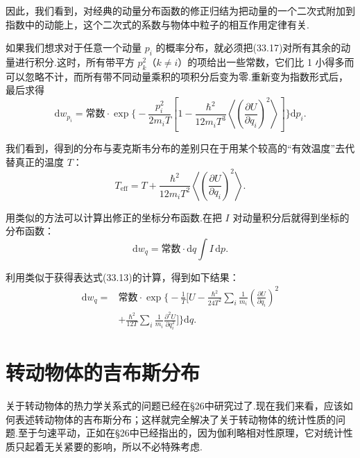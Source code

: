 因此，我们看到，对经典的动量分布函数的修正归结为把动量的一个二次式附加到指数中的动能上，这个二次式的系数与物体中粒子的相互作用定律有关.

如果我们想求对于任意一个动量 $p_i$ 的概率分布，就必须把(33.17)对所有其余的动量进行积分.这时，所有带平方 $p_k^2$（$k\neq i$）的项给出一些常数，它们比 1 小得多而可以忽略不计，而所有带不同动量乘积的项积分后变为零.重新变为指数形式后，最后求得
\begin{equation}
  \mathrm{d}w_{p_i}=\text{常数}\cdot\exp\bigg\{-\frac{p_i^2}{2m_iT}
  \left[1-\frac{\hbar^2}{12m_iT^3}
  \left\langle\left(\frac{\partial U}{\partial q_i}\right)^2\right\rangle\right]\bigg\}\mathrm{d}p_i.
\end{equation}

我们看到，得到的分布与麦克斯韦分布的差别只在于用某个较高的“有效温度”去代替真正的温度 $T$：
\begin{equation*}
  T_{\mathrm{eff}}=T+\frac{\hbar^2}{12m_iT^2}
  \left\langle\left(\frac{\partial U}{\partial q_i}\right)^2\right\rangle.
\end{equation*}

用类似的方法可以计算出修正的坐标分布函数.在把 $I$ 对动量积分后就得到坐标的分布函数：
\begin{equation*}
  \mathrm{d}w_q=\text{常数}\cdot\mathrm{d}q\int I\,\mathrm{d}p.
\end{equation*}

利用类似于获得表达式(33.13)的计算，得到如下结果：
\begin{equation}
\begin{aligned}
  \mathrm{d}w_q={}&\text{常数}\cdot\exp\bigg\{-\frac{1}{T}\bigg[U
  -\frac{\hbar^2}{24T^2}\sum_i\frac{1}{m_i}\left(\frac{\partial U}{\partial q_i}\right)^2\\
  &+\frac{\hbar^2}{12T}\sum_i\frac{1}{m_i}\frac{\partial^2U}{\partial q_i^2}\bigg]\bigg\}\mathrm{d}q.
\end{aligned}
\end{equation}

\section{转动物体的吉布斯分布}

关于转动物体的热力学关系式的问题已经在§26中研究过了.现在我们来看，应该如何表述转动物体的吉布斯分布；这样就完全解决了关于转动物体的统计性质的问题.至于匀速平动，正如在§26中已经指出的，因为伽利略相对性原理，它对统计性质只起着无关紧要的影响，所以不必特殊考虑.

